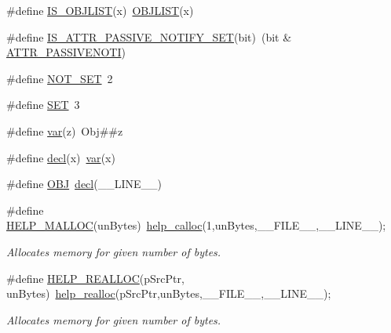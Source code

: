 \begin{DoxyCompactItemize}
\item 
\#define \hyperlink{group__LIBHELP_ga6e3ff99394385544686d23c7e6f52922}{I\-S\-\_\-\-O\-B\-J\-L\-I\-S\-T}(x)~\hyperlink{group__LIBHELP_ga62f1164f5252ae6639d85d5dea956f7d}{O\-B\-J\-L\-I\-S\-T}(x)
\item 
\#define \hyperlink{group__LIBHELP_ga06ed2f6c3b32cc225f54bbce3318da0d}{I\-S\-\_\-\-A\-T\-T\-R\-\_\-\-P\-A\-S\-S\-I\-V\-E\-\_\-\-N\-O\-T\-I\-F\-Y\-\_\-\-S\-E\-T}(bit)~(bit \& \hyperlink{group__LIBHELP_gga394c61369f4e995f18b58c77d1a3cccbaeb39c01e580d65085d016537cae56d77}{A\-T\-T\-R\-\_\-\-P\-A\-S\-S\-I\-V\-E\-N\-O\-T\-I})
\item 
\#define \hyperlink{group__LIBHELP_ga53228be549fb0aa91100133f3d83846d}{N\-O\-T\-\_\-\-S\-E\-T}~2
\item 
\#define \hyperlink{group__LIBHELP_ga59da1d65e87a723efe808dbabb4fc205}{S\-E\-T}~3
\item 
\#define \hyperlink{group__LIBHELP_ga9950f69951d6aaacf948b95052b81aec}{var}(z)~Obj\#\#z
\item 
\#define \hyperlink{group__LIBHELP_gabbd9e3da57fc82710ee86747db251754}{decl}(x)~\hyperlink{group__LIBHELP_ga9950f69951d6aaacf948b95052b81aec}{var}(x)
\item 
\#define \hyperlink{group__LIBHELP_gadbde5b9da0fc01ad88668b5f24c2c256}{O\-B\-J}~\hyperlink{group__LIBHELP_gabbd9e3da57fc82710ee86747db251754}{decl}(\-\_\-\-\_\-\-L\-I\-N\-E\-\_\-\-\_\-)
\item 
\#define \hyperlink{group__LIBHELP_gab74b1673d9374a4f785c2701e9537566}{H\-E\-L\-P\-\_\-\-M\-A\-L\-L\-O\-C}(un\-Bytes)~\hyperlink{group__LIBHELP_gad69e4cc1b0997b751beff9531e3b858b}{help\-\_\-calloc}(1,un\-Bytes,\-\_\-\-\_\-\-F\-I\-L\-E\-\_\-\-\_\-,\-\_\-\-\_\-\-L\-I\-N\-E\-\_\-\-\_\-);
\begin{DoxyCompactList}\small\item\em Allocates memory for given number of bytes. \end{DoxyCompactList}\item 
\#define \hyperlink{group__LIBHELP_ga6f143d43adbea1e9206a4fe18a540756}{H\-E\-L\-P\-\_\-\-R\-E\-A\-L\-L\-O\-C}(p\-Src\-Ptr, un\-Bytes)~\hyperlink{group__LIBHELP_ga31a678674884400ad5f6b17eda22ee74}{help\-\_\-realloc}(p\-Src\-Ptr,un\-Bytes,\-\_\-\-\_\-\-F\-I\-L\-E\-\_\-\-\_\-,\-\_\-\-\_\-\-L\-I\-N\-E\-\_\-\-\_\-);
\begin{DoxyCompactList}\small\item\em Allocates memory for given number of bytes. \end{DoxyCompactList}\item 

\end{DoxyCompactItemize}

